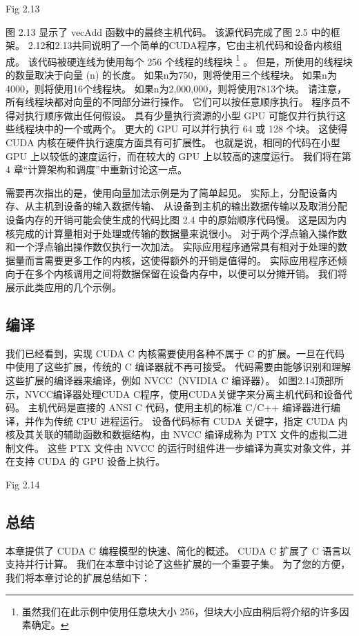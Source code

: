 {\color{red} Fig 2.13}

图 2.13 显示了 vecAdd 函数中的最终主机代码。 该源代码完成了图 2.5 中的框架。 
2.12和2.13共同说明了一个简单的CUDA程序，它由主机代码和设备内核组成。 该代码被硬连线为使用每个 256 个线程的线程块
\footnote{虽然我们在此示例中使用任意块大小 256，但块大小应由稍后将介绍的许多因素确定。} 。 
但是，所使用的线程块的数量取决于向量 (n) 的长度。 如果n为750，则将使用三个线程块。 如果n为4000，则将使用16个线程块。 
如果n为2,000,000，则将使用7813个块。 请注意，所有线程块都对向量的不同部分进行操作。 
它们可以按任意顺序执行。 程序员不得对执行顺序做出任何假设。 
具有少量执行资源的小型 GPU 可能仅并行执行这些线程块中的一个或两个。 更大的 GPU 可以并行执行 64 或 128 个块。 
这使得 CUDA 内核在硬件执行速度方面具有可扩展性。 
也就是说，相同的代码在小型 GPU 上以较低的速度运行，而在较大的 GPU 上以较高的速度运行。 
我们将在第 4 章“计算架构和调度”中重新讨论这一点。

需要再次指出的是，使用向量加法示例是为了简单起见。 
实际上，分配设备内存、从主机到设备的输入数据传输、
从设备到主机的输出数据传输以及取消分配设备内存的开销可能会使生成的代码比图 2.4 中的原始顺序代码慢。 
这是因为内核完成的计算量相对于处理或传输的数据量来说很小。 对于两个浮点输入操作数和一个浮点输出操作数仅执行一次加法。 
实际应用程序通常具有相对于处理的数据量而言需要更多工作的内核，这使得额外的开销是值得的。 
实际应用程序还倾向于在多个内核调用之间将数据保留在设备内存中，以便可以分摊开销。 我们将展示此类应用的几个示例。

\subsection{编译}
我们已经看到，实现 CUDA C 内核需要使用各种不属于 C 的扩展。一旦在代码中使用了这些扩展，传统的 C 编译器就不再可接受。 
代码需要由能够识别和理解这些扩展的编译器来编译，例如 NVCC（NVIDIA C 编译器）。 
如图2.14顶部所示，NVCC编译器处理CUDA C程序，使用CUDA关键字来分离主机代码和设备代码。 
主机代码是直接的 ANSI C 代码，使用主机的标准 C/C++ 编译器进行编译，并作为传统 CPU 进程运行。 
设备代码标有 CUDA 关键字，指定 CUDA 内核及其关联的辅助函数和数据结构，由 NVCC 编译成称为 PTX 文件的虚拟二进制文件。 
这些 PTX 文件由 NVCC 的运行时组件进一步编译为真实对象文件，并在支持 CUDA 的 GPU 设备上执行。

{\color{red} Fig 2.14}

\subsection{总结}
本章提供了 CUDA C 编程模型的快速、简化的概述。 CUDA C 扩展了 C 语言以支持并行计算。 
我们在本章中讨论了这些扩展的一个重要子集。 为了您的方便，我们将本章讨论的扩展总结如下：


